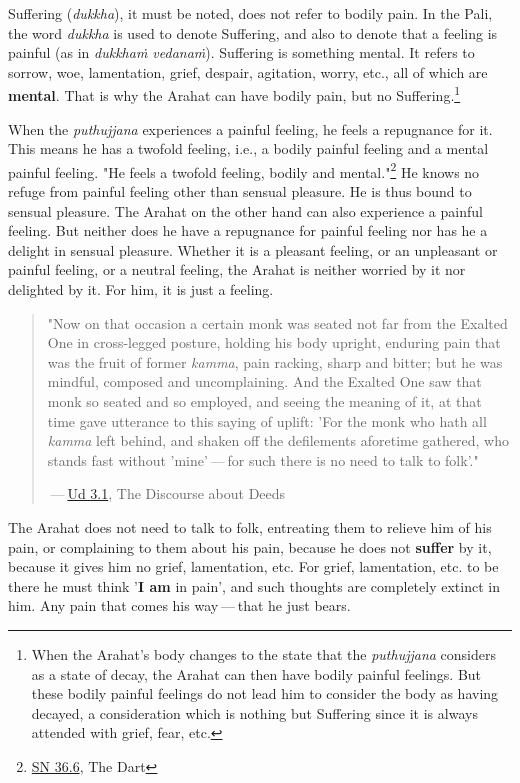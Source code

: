 Suffering (\emph{dukkha}), it must be noted, does not refer to bodily pain. In the Pali, the word \emph{dukkha} is used to denote Suffering, and also to denote that a feeling is painful (as in \emph{dukkhaṁ vedanaṁ}). Suffering is something mental. It refers to sorrow, woe, lamentation, grief, despair, agitation, worry, etc., all of which are \textbf{mental}. That is why the Arahat can have bodily pain, but no Suffering.\footnote{When the Arahat's body changes to the state that the \emph{puthujjana} considers as a state of decay, the Arahat can then have bodily painful feelings. But these bodily painful feelings do not lead him to consider the body as having decayed, a consideration which is nothing but Suffering since it is always attended with grief, fear, etc.}

When the \emph{puthujjana} experiences a painful feeling, he feels a repugnance for it. This means he has a twofold feeling, i.e., a bodily painful feeling and a mental painful feeling. "He feels a twofold feeling, bodily and mental."\footnote{\href{https://suttacentral.net/sn36.6/en/bodhi}{SN 36.6}, The Dart} He knows no refuge from painful feeling other than sensual pleasure. He is thus bound to sensual pleasure. The Arahat on the other hand can also experience a painful feeling. But neither does he have a repugnance for painful feeling nor has he a delight in sensual pleasure. Whether it is a pleasant feeling, or an unpleasant or painful feeling, or a neutral feeling, the Arahat is neither worried by it nor delighted by it. For him, it is just a feeling.

\begin{quote}
"Now on that occasion a certain monk was seated not far from the Exalted One in cross-legged posture, holding his body upright, enduring pain that was the fruit of former \emph{kamma}, pain racking, sharp and bitter; but he was mindful, composed and uncomplaining. And the Exalted One saw that monk so seated and so employed, and seeing the meaning of it, at that time gave utterance to this saying of uplift: 'For the monk who hath all \emph{kamma} left behind, and shaken off the defilements aforetime gathered, who stands fast without 'mine' --- for such there is no need to talk to folk'."

 --- \href{https://suttacentral.net/ud3.1/en/anandajoti}{Ud 3.1}, The Discourse about Deeds
\end{quote}

The Arahat does not need to talk to folk, entreating them to relieve him of his pain, or complaining to them about his pain, because he does not \textbf{suffer} by it, because it gives him no grief, lamentation, etc. For grief, lamentation, etc. to be there he must think '\textbf{I am} in pain', and such thoughts are completely extinct in him. Any pain that comes his way --- that he just bears.

